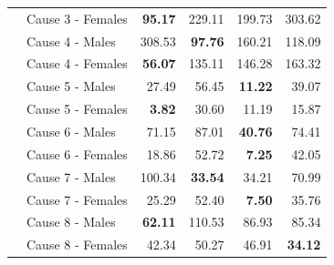 \begin{center}
\begin{small}
\begin{longtable}{@{}llrrrr@{}}
& Cause 3 - Females & \textbf{95.17} & 229.11 & 199.73 & 303.62 \\
& Cause 4 - Males & 308.53 & \textbf{97.76} & 160.21 & 118.09 \\
& Cause 4 - Females & \textbf{56.07} & 135.11 & 146.28 & 163.32 \\
& Cause 5 - Males & 27.49 & 56.45 & \textbf{11.22} & 39.07 \\
& Cause 5 - Females & \textbf{3.82} & 30.60 & 11.19 & 15.87 \\
& Cause 6 - Males & 71.15 & 87.01 & \textbf{40.76} & 74.41 \\
& Cause 6 - Females & 18.86 & 52.72 & \textbf{7.25} & 42.05 \\
& Cause 7 - Males & 100.34 & \textbf{33.54} & 34.21 & 70.99 \\
& Cause 7 - Females & 25.29 & 52.40 & \textbf{7.50} & 35.76 \\
& Cause 8 - Males & \textbf{62.11} & 110.53 & 86.93 & 85.34 \\
& Cause 8 - Females & 42.34 & 50.27 & 46.91 & \textbf{34.12} \\
\bottomrule
\end{longtable}
\end{small}
\end{center}
